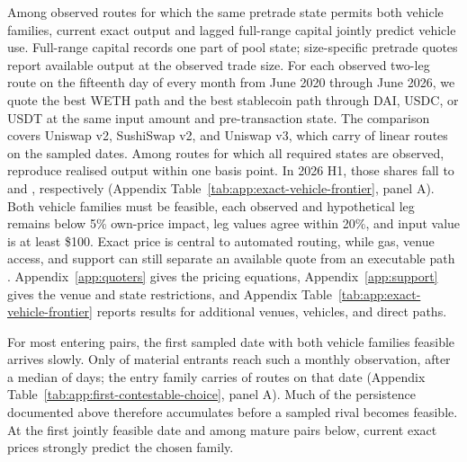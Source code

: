 Among observed routes for which the same pretrade state permits both vehicle families, current exact output and lagged full-range capital jointly predict vehicle use. Full-range capital records one part of pool state; size-specific pretrade quotes report available output at the observed trade size. For each observed two-leg route on the fifteenth day of every month from June 2020 through June 2026, we quote the best WETH path and the best stablecoin path through DAI, USDC, or USDT at the same input amount and pre-transaction state. The comparison covers Uniswap v2, SushiSwap v2, and Uniswap v3, which carry \ExactFrontierVenueCoverage{} of linear routes on the sampled dates. Among routes for which all required states are observed, \ExactFrontierReproduction{} reproduce realised output within one basis point. In 2026 H1, those shares fall to \ExactFrontierVenueCoverageEnd{} and \ExactFrontierReproductionEnd{}, respectively (Appendix Table~\ref{tab:app:exact-vehicle-frontier}, panel A). Both vehicle families must be feasible, each observed and hypothetical leg remains below 5\% own-price impact, leg values agree within 20\%, and input value is at least \$100. Exact price is central to automated routing, while gas, venue access, and support can still separate an available quote from an executable path \citep{XiMoallemi2026Routing}. Appendix~\ref{app:quoters} gives the pricing equations, Appendix~\ref{app:support} gives the venue and state restrictions, and Appendix Table~\ref{tab:app:exact-vehicle-frontier} reports results for additional venues, vehicles, and direct paths.

For most entering pairs, the first sampled date with both vehicle families feasible arrives slowly. Only \FirstContestCoverage{} of material entrants reach such a monthly observation, after a median of \FirstContestMedianLagDays{} days; the entry family carries \FirstContestRouteRetention{} of routes on that date (Appendix Table~\ref{tab:app:first-contestable-choice}, panel A). Much of the persistence documented above therefore accumulates before a sampled rival becomes feasible. At the first jointly feasible date and among mature pairs below, current exact prices strongly predict the chosen family.

